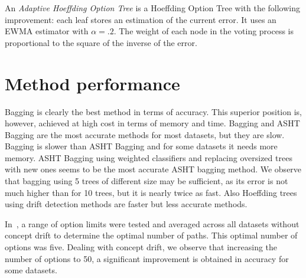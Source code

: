 An {\em Adaptive Hoeffding Option Tree} is a Hoeffding Option Tree with the following improvement:
each leaf stores an estimation of the current error. It uses an EWMA
estimator with $\alpha =.2$.
The weight of each node in the voting process is 
proportional to the square of the inverse of the error.

\section{Method performance}

Bagging is clearly the best method in terms of accuracy. This superior position
is, however, achieved at high cost in terms of memory and time. 
\adwin Bagging and ASHT Bagging are the most accurate methods for most datasets, but they 
are slow.
 \adwin Bagging is slower than ASHT Bagging and for some datasets it 
needs more memory. 
ASHT Bagging using weighted classifiers and replacing oversized trees 
with new ones seems to be the most accurate ASHT bagging method.
We observe that bagging using 5 trees of different size may be 
sufficient, as its error is not much {higher} %
than for 10 trees, but it is nearly {twice as fast}. %
Also Hoeffding trees using drift detection methods are faster but less accurate methods.

 In~\cite{optiontrees}, a range of option limits were tested and averaged across all datasets without
concept drift to determine the optimal number of paths. This optimal number of options was five.
Dealing with concept drift, we observe that increasing the number of options to 50, 
 a significant improvement is obtained in accuracy for some datasets. 
